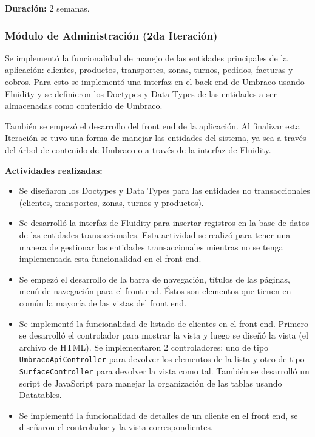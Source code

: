 \textbf{Duración:} 2 semanas.

\subsubsection{Módulo de Administración (2da Iteración)}
Se implementó la funcionalidad de manejo de las entidades principales de la aplicación: clientes, productos, transportes, zonas, turnos, pedidos, facturas y cobros. Para esto se implementó una interfaz en el back end de Umbraco usando Fluidity y se definieron los Doctypes y Data Types de las entidades a ser almacenadas como contenido de Umbraco.

También se empezó el desarrollo del front end de la aplicación. Al finalizar esta Iteración se tuvo una forma de manejar las entidades del sistema, ya sea a través del árbol de contenido de Umbraco o a través de la interfaz de Fluidity.

\vspace{0.3cm}
\textbf{Actividades realizadas:}
\begin{itemize}
    \item Se diseñaron los Doctypes y Data Types para las entidades no transaccionales (clientes, transportes, zonas, turnos y productos).
    \item Se desarrolló la interfaz de Fluidity para insertar registros en la base de datos de las entidades transaccionales. Esta actividad se realizó para tener una manera de gestionar las entidades transaccionales mientras no se tenga implementada esta funcionalidad en el front end.
    \item Se empezó el desarrollo de la barra de navegación, títulos de las páginas, menú de navegación para el front end. Éstos son elementos que tienen en común la mayoría de las vistas del front end.
    \item Se implementó la funcionalidad de listado de clientes en el front end. Primero se desarrolló el controlador para mostrar la vista y luego se diseñó la vista (el archivo de HTML). Se implementaron 2 controladores: uno de tipo \texttt{UmbracoApiController} para devolver los elementos de la lista y otro de tipo \texttt{SurfaceController} para devolver la vista como tal. También se desarrolló un script de JavaScript para manejar la organización de las tablas usando Datatables.
    \item Se implementó la funcionalidad de detalles de un cliente en el front end, se diseñaron el controlador y la vista correspondientes.
\end{itemize}

